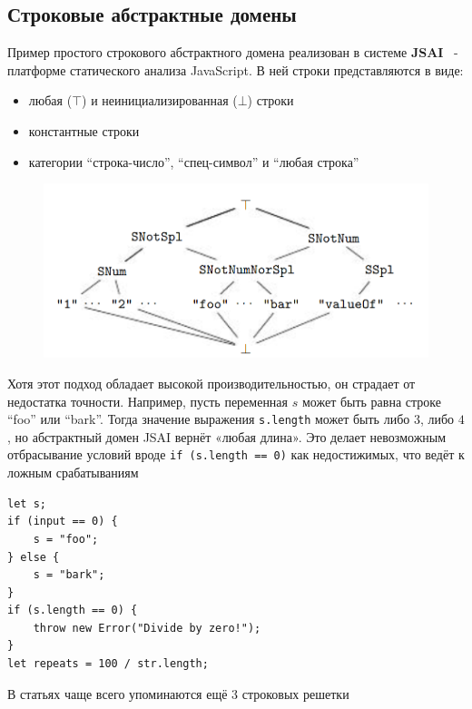 \subsection{Строковые абстрактные домены}

Пример простого строкового абстрактного домена реализован в системе \textbf{JSAI}~\cite{guha2012jsai} - платформе статического анализа JavaScript. В ней строки представляются в виде:
\begin{itemize}
    \item любая ($\top$) и неинициализированная ($\bot$) строки
    \item константные строки
    \item категории ``строка-число'', ``спец-символ'' и ``любая строка''
\end{itemize}

\begin{figure}[H]
\includegraphics[width=\textwidth]{images/jsai-string-lattice.png}\hfill
\end{figure}


Хотя этот подход обладает высокой производительностью, он страдает от недостатка точности. Например, пусть переменная $s$ может быть равна строке ``foo'' или ``bark''. Тогда значение выражения \texttt{s.length} может быть либо $3$, либо $4$, но абстрактный домен JSAI вернёт «любая длина». Это делает невозможным отбрасывание условий вроде \texttt{if (s.length == 0)} как недостижимых, что ведёт к ложным срабатываниям

\newpage
\begin{lstlisting}[caption={Пример недостаточной точности в строковом домене JSAI}]
let s;
if (input == 0) {
    s = "foo";
} else {
    s = "bark";
}
if (s.length == 0) {
    throw new Error("Divide by zero!");
}
let repeats = 100 / str.length;
\end{lstlisting}

В статьях чаще всего упоминаются ещё 3 строковых решетки

